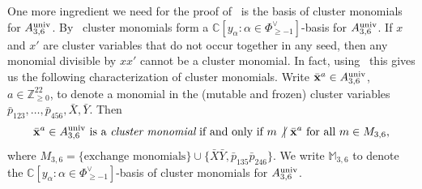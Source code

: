 \documentclass[pdftex]{sigma}%
\numberwithin{equation}{section}
\DeclareMathOperator{\univ}{univ}
\begin{document}
\medskip

One more ingredient we need for the proof of~ is the basis of cluster monomials for $ A^{\rm univ}_{3,6}$.
By~\cite[Theorem~0.3 and p.~502]{GHKK} cluster monomials form a $\mathbb C[y_\alpha\colon \alpha\in \Phi^{\vee}_{\ge -1}]$-basis for $A_{3,6}^{\rm univ}$.
If $x$ and $x'$ are cluster variables that do not occur together in any seed, then any monomial divisible by $xx'$ cannot be a cluster monomial.
In fact, using~\cite[Theorem~7.12(b)]{Kel12} this gives us the following characterization of cluster monomials.
Write $\bar {\bf x}^{a}\in A_{3,6}^{\rm univ}$, $a\in \mathbb Z_{\ge 0}^{22}$, to denote a monomial in the (mutable and frozen) cluster variables $\bar p_{123},\dots, \bar p_{456},\bar X,\bar Y$. Then
\begin{gather}\label{eq:basis A36univ}
\bar {\bf x}^{a}\in A_{3,6}^{\univ} \text{ is a {\it cluster monomial} if and only if } m \not\vert \ \bar {\bf x}^a \text{ for all } m\in M_{3,6},
\end{gather}
where $M_{3,6}=\{\text{exchange monomials}\} \cup \big\{\bar X\bar Y,\bar p_{135}\bar p_{246}\big\}$. We write $\mathbb M_{3,6}$ to denote the $\mathbb C[y_\alpha\colon \alpha\in \Phi^{\vee}_{\ge -1}]$-basis of cluster monomials for $A_{3,6}^{\rm univ}$.
\end{document}
